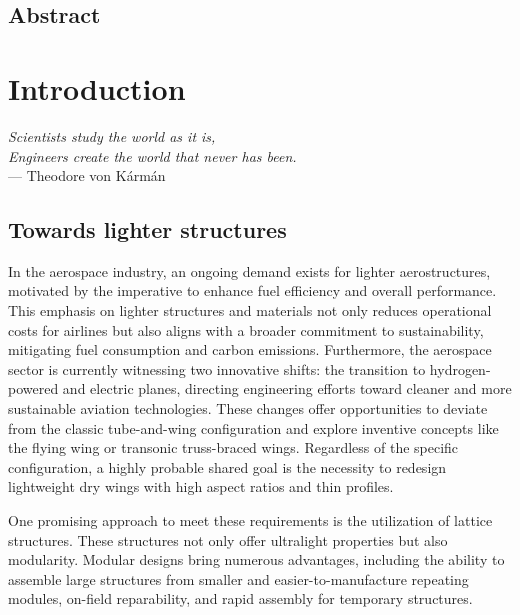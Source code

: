 \section*{Abstract}

\chapter*{Introduction}

\textit{Scientists study the world as it is,}\\
\textit{Engineers create the world that never has been.} \vspace{5pt} \\
--- Theodore von K\'arm\'an \\

\section*{Towards lighter structures}

In the aerospace industry, an ongoing demand exists for lighter aerostructures, motivated by the imperative to enhance fuel efficiency and overall performance. This emphasis on lighter structures and materials not only reduces operational costs for airlines but also aligns with a broader commitment to sustainability, mitigating fuel consumption and carbon emissions. Furthermore, the aerospace sector is currently witnessing two innovative shifts: the transition to hydrogen-powered and electric planes, directing engineering efforts toward cleaner and more sustainable aviation technologies. These changes offer opportunities to deviate from the classic tube-and-wing configuration and explore inventive concepts like the flying wing or transonic truss-braced wings. Regardless of the specific configuration, a highly probable shared goal is the necessity to redesign lightweight dry wings with high aspect ratios and thin profiles.

One promising approach to meet these requirements is the utilization of lattice structures. These structures not only offer ultralight properties but also modularity. Modular designs bring numerous advantages, including the ability to assemble large structures from smaller and easier-to-manufacture repeating modules, on-field reparability, and rapid assembly for temporary structures.

